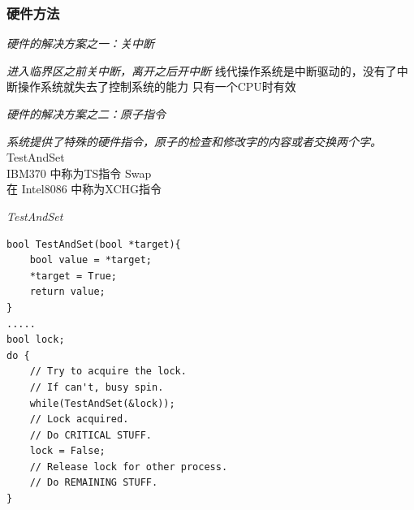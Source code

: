 \documentclass{ctexart}
\begin{document}
\subsubsection{硬件方法}
\begin{outline}
    \1 \emph{硬件的解决方案之一：关中断}

    \emph{进入临界区之前关中断，离开之后开中断}
        \2 线代操作系统是中断驱动的，没有了中断操作系统就失去了控制系统的能力
        \2 只有一个CPU时有效

    \1 \emph{硬件的解决方案之二：原子指令}

    \emph{系统提供了特殊的硬件指令，原子的检查和修改字的内容或者交换两个字。 }
        \2 TestAndSet \\ IBM370 中称为TS指令
        \2 Swap \\ 在 Intel8086 中称为XCHG指令
    
    \1 \emph{TestAndSet}

    \begin{verbatim}
bool TestAndSet(bool *target){
    bool value = *target;
    *target = True;
    return value;
}
.....
bool lock;
do {
    // Try to acquire the lock.
    // If can't, busy spin.
    while(TestAndSet(&lock));
    // Lock acquired.
    // Do CRITICAL STUFF.
    lock = False;
    // Release lock for other process.
    // Do REMAINING STUFF.
}
    \end{verbatim}


\end{outline}
\end{document}
